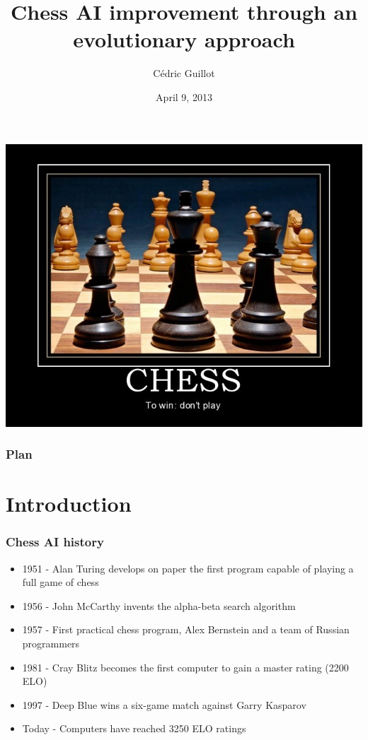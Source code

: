 \documentclass{beamer}
\author{Cédric Guillot}
\institute{CPSC 565}
\title{Chess AI improvement through an evolutionary approach}
\date{April 9, 2013}
\begin{document}
\begin{frame}
\titlepage
\end{frame}

\begin{frame}
\begin{center}
\includegraphics[scale=0.47]{images/to_win_dont_play.jpg}
\end{center}
\end{frame}

\begin{frame}
\frametitle{Plan}
\tableofcontents
\end{frame}

\section{Introduction}
\begin{frame}
\frametitle{Chess AI history}
\begin{itemize}
\item 1951 - Alan Turing develops on paper the first program capable of playing a full game of chess
\item 1956 - John McCarthy invents the alpha-beta search algorithm
\item 1957 - First practical chess program, Alex Bernstein and a team of Russian programmers
\item 1981 - Cray Blitz becomes the first computer to gain a master rating (2200 ELO)
\item 1997 - Deep Blue wins a six-game match against Garry Kasparov
\item Today - Computers have reached 3250 ELO ratings
\end{itemize}
\end{frame}
\end{document}
